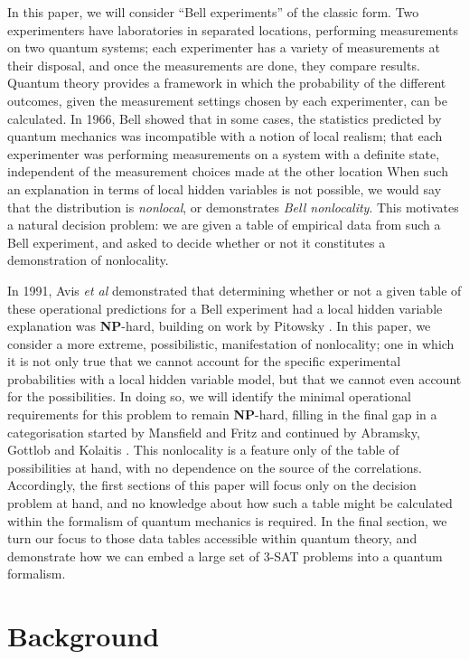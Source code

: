 \documentclass[reprint]{revtex4-1}
\theoremstyle{definition}
\begin{document}
In this paper, we will consider ``Bell experiments'' of the classic form. Two experimenters have laboratories in separated locations, performing measurements on two quantum systems; each experimenter has a variety of measurements at their disposal, and once the measurements are done, they compare results. Quantum theory provides a framework in which the probability of the different outcomes, given the measurement settings chosen by each experimenter, can be calculated. In 1966, Bell showed that in some cases, the statistics predicted by quantum mechanics was incompatible with a notion of local realism; that each experimenter was performing measurements on a system with a definite state, independent of the measurement choices made at the other location \cite{Bell1966} When such an explanation in terms of local hidden variables is not possible, we would say that the distribution is \emph{nonlocal}, or demonstrates \emph{Bell nonlocality}. This motivates a natural decision problem: we are given a table of empirical data from such a Bell experiment, and asked to decide whether or not it constitutes a demonstration of nonlocality. 

In 1991, Avis \emph{et al} \cite{Avis2004} demonstrated that determining whether or not a given table of these operational predictions for a Bell experiment had a local hidden variable explanation was \textbf{NP}-hard, building on work by Pitowsky \cite{Pito1991}. In this paper, we consider a more extreme, possibilistic, manifestation of nonlocality; one in which it is not only true that we cannot account for the specific experimental probabilities with a local hidden variable model, but that we cannot even account for the possibilities. In doing so, we will identify the minimal operational requirements for this problem to remain \textbf{NP}-hard, filling in the final gap in a categorisation started by Mansfield and Fritz \cite{Mans2011,Mans2016} and continued by Abramsky, Gottlob and Kolaitis \cite{Abra2013}. This nonlocality is a feature only of the table of possibilities at hand, with no dependence on the source of the correlations. Accordingly, the first sections of this paper will focus only on the decision problem at hand, and no knowledge about how such a table might be calculated within the formalism of quantum mechanics is required. In the final section, we turn our focus to those data tables accessible within quantum theory, and demonstrate how we can embed a large set of \textsc{3-SAT} problems into a quantum formalism.


\section{Background}
\end{document}

